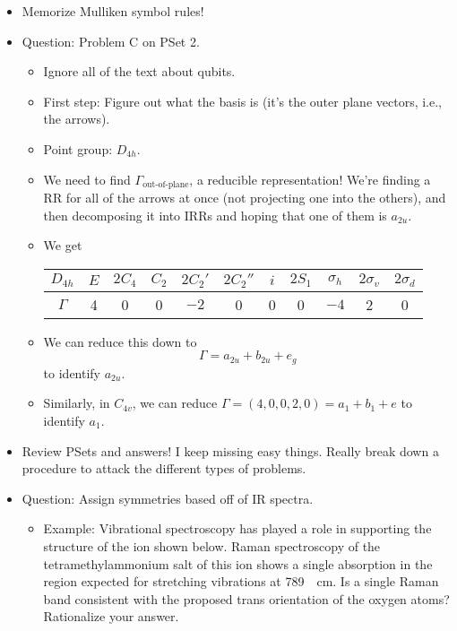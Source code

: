 \documentclass[../notes.tex]{subfiles}
\begin{document}
\begin{itemize}
\begin{itemize}
    \end{itemize}
    \item Memorize Mulliken symbol rules!
    \item Question: Problem C on PSet 2.
    \begin{itemize}
        \item Ignore all of the text about qubits.
        \item First step: Figure out what the basis is (it's the outer plane vectors, i.e., the arrows).
        \item Point group: $D_{4h}$.
        \item We need to find $\Gamma_\text{out-of-plane}$, a reducible representation! We're finding a RR for all of the arrows at once (not projecting one into the others), and then decomposing it into IRRs and hoping that one of them is $a_{2u}$.
        \item We get
        \begin{center}
            \small
            \renewcommand{\arraystretch}{1.2}
            \begin{tabular}{c|cccccccccc}
                $D_{4h}$ & $E$ & $2C_4$ & $C_2$ & $2C_2'$ & $2C_2''$ & $i$ & $2S_1$ & $\sigma_h$ & $2\sigma_v$ & $2\sigma_d$\\
                \hline
                $\Gamma$ & 4 & 0 & 0 & $-2$ & 0 & 0 & 0 & $-4$ & 2 & 0
            \end{tabular}
        \end{center}
        \item We can reduce this down to
        \begin{equation*}
            \Gamma = a_{2u}+b_{2u}+e_g
        \end{equation*}
        to identify $a_{2u}$.
        \item Similarly, in $C_{4v}$, we can reduce $\Gamma=(4,0,0,2,0)=a_1+b_1+e$ to identify $a_1$.
    \end{itemize}
    \item Review PSets and answers! I keep missing easy things. Really break down a procedure to attack the different types of problems.
    \item Question: Assign symmetries based off of IR spectra.
    \begin{itemize}
        \item Example: Vibrational spectroscopy has played a role in supporting the structure of the ion shown below. Raman spectroscopy of the tetramethylammonium salt of this ion shows a single absorption in the region expected for  stretching vibrations at \SI{789}{\per\centi\meter}. Is a single Raman band consistent with the proposed trans orientation of the oxygen atoms? Rationalize your answer.

\end{itemize}
\end{itemize}
\end{document}
